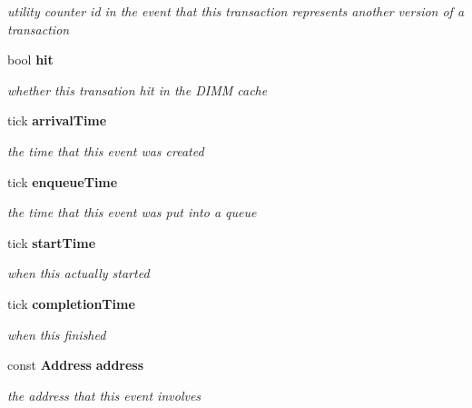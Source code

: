 \begin{DoxyCompactItemize}
\begin{DoxyCompactList}\small\item\em utility counter id in the event that this transaction represents another version of a transaction \item\end{DoxyCompactList}\item 
bool {\bf hit}\label{class_d_r_a_msim_i_i_1_1_transaction_aede03bcdc308e5283358dfed9b1807be}

\begin{DoxyCompactList}\small\item\em whether this transation hit in the DIMM cache \item\end{DoxyCompactList}\item 
tick {\bf arrivalTime}\label{class_d_r_a_msim_i_i_1_1_event_a5eae270c205a02b2fb28d11ab84a6ed9}

\begin{DoxyCompactList}\small\item\em the time that this event was created \item\end{DoxyCompactList}\item 
tick {\bf enqueueTime}\label{class_d_r_a_msim_i_i_1_1_event_a55cd17fa82ce4031824037df59dc50d3}

\begin{DoxyCompactList}\small\item\em the time that this event was put into a queue \item\end{DoxyCompactList}\item 
tick {\bf startTime}\label{class_d_r_a_msim_i_i_1_1_event_a9f6b444813bf6568040678e0d8139d44}

\begin{DoxyCompactList}\small\item\em when this actually started \item\end{DoxyCompactList}\item 
tick {\bf completionTime}\label{class_d_r_a_msim_i_i_1_1_event_a2a6e865d555bcde6264e8726edc95b38}

\begin{DoxyCompactList}\small\item\em when this finished \item\end{DoxyCompactList}\item 
const {\bf Address} {\bf address}\label{class_d_r_a_msim_i_i_1_1_event_a6aa0830ccf3c9f103bc6dfaab1919562}

\begin{DoxyCompactList}\small\item\em the address that this event involves \item\end{DoxyCompactList}\end{DoxyCompactItemize}


